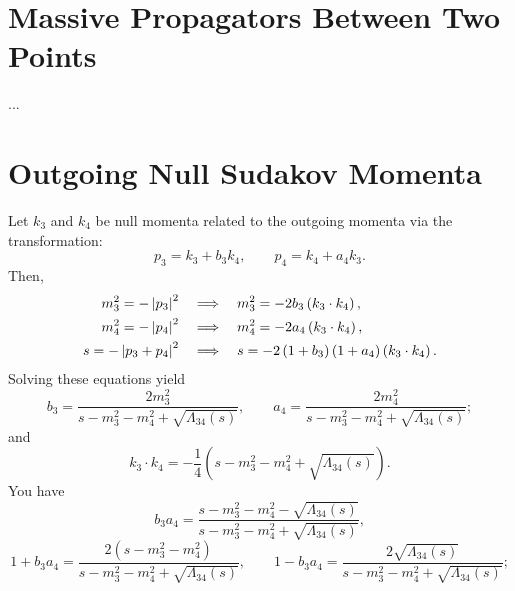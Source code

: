 \section{Massive Propagators Between Two Points}
...
\section{Outgoing Null Sudakov Momenta}
Let $k_{3}$ and $k_{4}$ be null momenta related to the outgoing momenta via the transformation:
\begin{equation}
	p_{3} = k_{3} + b_{3} k_{4}, \qquad p_{4} = k_{4} + a_{4} k_{3}.
	\label{eq:sudakov_3_4}
\end{equation}
Then,
\begin{align}
	m_{3}^{2} = - \left\lvert p_{3} \right\rvert^{2} \quad &\Longrightarrow \quad m_{3}^{2} = - 2 b_{3} \left( k_{3} \cdot k_{4} \right), \\
	m_{4}^{2} = - \left\lvert p_{4} \right\rvert^{2} \quad &\Longrightarrow \quad m_{4}^{2} = - 2 a_{4} \left( k_{3} \cdot k_{4} \right), \\
	s = - \left\lvert p_{3} + p_{4} \right\rvert^{2} \quad &\Longrightarrow \quad s = - 2 \left(1 + b_{3} \right) \left(1 + a_{4} \right) \left( k_{3} \cdot k_{4} \right).
\end{align}
Solving these equations yield
\begin{equation}
	b_{3} = \frac{2 m_{3}^{2}}{s - m_{3}^{2} - m_{4}^{2} + \sqrt{\Lambda_{34}(s)}}, \qquad a_{4} = \frac{2 m_{4}^{2}}{s - m_{3}^{2} - m_{4}^{2} + \sqrt{\Lambda_{34}(s)}};
\end{equation}
and
\begin{equation}
	k_{3} \cdot k_{4} = -\frac{1}{4} \left( s - m_{3}^{2} - m_{4}^{2} + \sqrt{\Lambda_{34}(s)} \right).
\end{equation}
You have
\begin{equation}
	b_{3} a_{4} = \frac{s - m_{3}^{2} - m_{4}^{2} - \sqrt{\Lambda_{34}(s)}}{s - m_{3}^{2} - m_{4}^{2} + \sqrt{\Lambda_{34}(s)}},
\end{equation}
\begin{equation}
	1 + b_{3} a_{4} = \frac{ 2 \left( s - m_{3}^{2} - m_{4}^{2} \right)}{s - m_{3}^{2} - m_{4}^{2} + \sqrt{\Lambda_{34}(s)}}, \qquad
	1 - b_{3} a_{4} = \frac{ 2 \sqrt{\Lambda_{34}(s)}}{s - m_{3}^{2} - m_{4}^{2} + \sqrt{\Lambda_{34}(s)}};
\end{equation}
